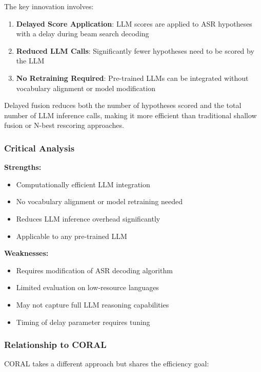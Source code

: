 The key innovation involves:

\begin{enumerate}[topsep=6pt,itemsep=3pt]
    \item \textbf{Delayed Score Application}: LLM scores are applied to ASR hypotheses with a delay during beam search decoding
    \item \textbf{Reduced LLM Calls}: Significantly fewer hypotheses need to be scored by the LLM
    \item \textbf{No Retraining Required}: Pre-trained LLMs can be integrated without vocabulary alignment or model modification
\end{enumerate}

Delayed fusion reduces both the number of hypotheses scored and the total number of LLM inference calls, making it more efficient than traditional shallow fusion or N-best rescoring approaches.

\subsubsection{Critical Analysis}

\textbf{Strengths:}
\begin{itemize}[topsep=4pt,itemsep=2pt]
    \item Computationally efficient LLM integration
    \item No vocabulary alignment or model retraining needed
    \item Reduces LLM inference overhead significantly
    \item Applicable to any pre-trained LLM
\end{itemize}

\textbf{Weaknesses:}
\begin{itemize}[topsep=4pt,itemsep=2pt]
    \item Requires modification of ASR decoding algorithm
    \item Limited evaluation on low-resource languages
    \item May not capture full LLM reasoning capabilities
    \item Timing of delay parameter requires tuning
\end{itemize}

\subsubsection{Relationship to CORAL}

CORAL takes a different approach but shares the efficiency goal:

